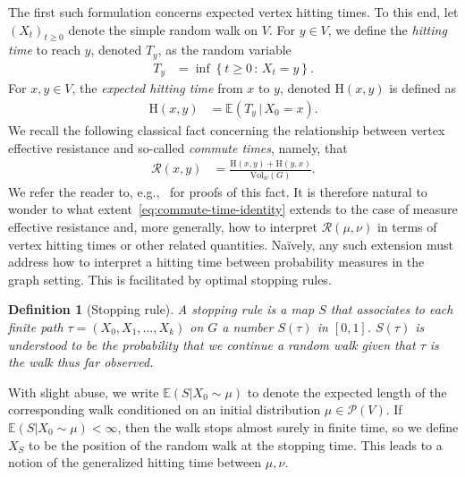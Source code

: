 \documentclass[11pt,a4paper]{article}
\newcommand{\Resis}{\mathcal{R}}
\newcommand{\Prob}{\mathscr{P}}
\newcommand{\Hitting}{\mathrm{H}}
\newcommand{\Vol}{\mathrm{Vol}}
\newcommand{\ep}[1]{\mathbb{E}\left({#1}\right)}
\newtheorem{definition}[theorem]{Definition}
\begin{document}
The first such formulation concerns expected vertex hitting times. To this end, let $(X_t)_{t\geq0}$ denote the simple random walk on $V$. For $y\in V$, we define the \emph{hitting time} to reach $y$, denoted $T_y$, as the random variable
    \begin{align*}
        T_y &= \inf \left\{t\ge 0 \,:\, X_{t} = y\right\}.
    \end{align*}
For $x, y\in V$, the \emph{expected hitting time} from $x$ to $y$, denoted $\Hitting(x, y)$ is defined as
    \begin{align*}
        \Hitting(x, y) &= \ep{T_{y} \,|\, X_0 = x}.
    \end{align*}
We recall the following classical fact concerning the relationship between vertex effective resistance and so-called \emph{commute times}, namely, that
    \begin{align}\label{eq:commute-time-identity}
        \Resis(x, y) &= \frac{\Hitting(x, y) + \Hitting(y, x)}{\Vol_w(G)}.
    \end{align}
We refer the reader to, e.g.,~\cite{tetali1991random,vonluxburg2014hitting} for proofs of this fact. It is therefore natural to wonder to what extent~\cref{eq:commute-time-identity} extends to the case of measure effective resistance and, more generally, how to interpret $\Resis(\mu,\nu)$ in terms of vertex hitting times or other related quantities. Na\"{i}vely, any such extension must address how to interpret a hitting time between probability measures in the graph setting. This is facilitated by optimal stopping rules.

\begin{definition}[Stopping rule]
    A \emph{stopping rule} is a map $S$ that associates to each finite path $\tau = (X_0, X_1, \dotsc, X_k)$ on $G$ a number $S(\tau)$ in $[0, 1]$. $S(\tau)$ is understood to be the probability that we continue a random walk given that $\tau$ is the walk thus far observed.
\end{definition}

With slight abuse, we write $\ep{S | X_0\sim \mu}$ to denote the expected length of the corresponding walk conditioned on an initial distribution $\mu\in\Prob(V)$. If $\ep{S | X_0\sim \mu }< \infty$, then the walk stops almost surely in finite time, so we define $X_{S}$ to be the position of the random walk at the stopping time. This leads to a notion of the generalized hitting time between $\mu, \nu$.
\end{document}
